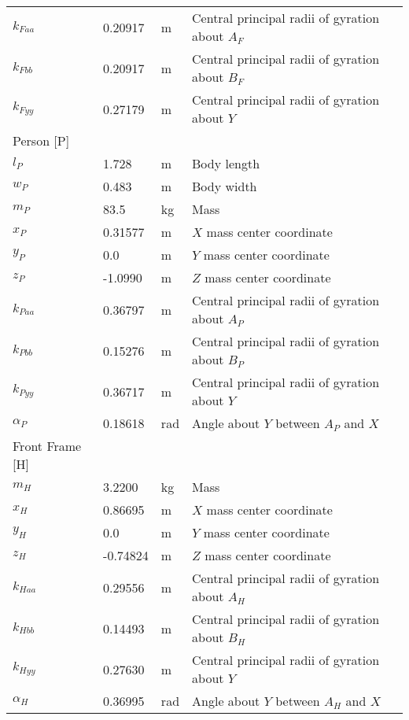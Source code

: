 \documentclass{bmd2019a}
\begin{document}
\begin{table}
\begin{tabular}{llll}
    $k_{Faa}$ &  0.20917 & \si{\meter} & Central principal radii of gyration about $A_F$ \\
    $k_{Fbb}$ &  0.20917 & \si{\meter} & Central principal radii of gyration about $B_F$ \\
    $k_{Fyy}$ &  0.27179 & \si{\meter} & Central principal radii of gyration about $Y$ \\
    Person [P] & & \\
    \midrule
    $l_P$      &  1.728   & \si{\meter} & Body length \\
    $w_P$      &  0.483   & \si{\meter} & Body width \\
    $m_P$      &  83.5    & \si{\kilogram} & Mass \\
    $x_P$      &  0.31577 & \si{\meter} & $X$ mass center coordinate \\
    $y_P$      & 0.0      & \si{\meter} & $Y$ mass center coordinate \\
    $z_P$      & -1.0990  & \si{\meter} & $Z$ mass center coordinate \\
    $k_{Paa}$  &  0.36797 & \si{\meter} & Central principal radii of gyration about $A_P$ \\
    $k_{Pbb}$  &  0.15276 & \si{\meter} & Central principal radii of gyration about $B_P$ \\
    $k_{Pyy}$  &  0.36717 & \si{\meter} & Central principal radii of gyration about $Y$ \\
    $\alpha_P$ & 0.18618 & \si{\radian} & Angle about $Y$ between $A_P$ and $X$ \\
    Front Frame [H] & & \\
    \midrule
    $m_H$ & 3.2200 & \si{\kilogram}     & Mass \\
    $x_H$ & 0.86695 & \si{\meter}       & $X$ mass center coordinate \\
    $y_H$ & 0.0 & \si{\meter}           & $Y$ mass center coordinate \\
    $z_H$ & -0.74824 & \si{\meter}      & $Z$ mass center coordinate \\
    $k_{Haa}$ & 0.29556 & \si{\meter}   & Central principal radii of gyration about $A_H$ \\
    $k_{Hbb}$ & 0.14493 & \si{\meter}   & Central principal radii of gyration about $B_H$ \\
    $k_{Hyy}$ & 0.27630 & \si{\meter}   & Central principal radii of gyration about $Y$ \\
    $\alpha_H$ & 0.36995 & \si{\radian} & Angle about $Y$ between $A_H$ and $X$ \\

\end{tabular}
\end{table}
\end{document}

